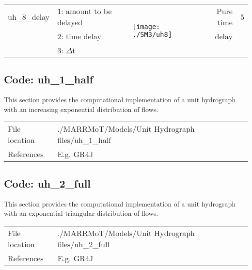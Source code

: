 \begin{table}[ht!]
\begin{tabular}{rp{10.57em}lrl}
\multicolumn{1}{p{6.215em}}{uh\_8\_delay} & 1: amount to be delayed & \multirow{3}[1]{*}{ \begin{minipage}{3cm} \texttt{[image: ./SM3/uh8]} \end{minipage} } & \multicolumn{1}{p{8.43em}}{Pure time} & 5 \\
          & 2: time delay &       & \multicolumn{1}{p{8.43em}}{delay} &  \\
          & 3: $\Delta$t  &       &       &  \\

    \bottomrule
    \end{tabular}%
  \label{tab:sm3_1}%
\end{table}%

\newpage
\subsection{Code: uh\_1\_half} \label{sec:sm3_1}
This section provides the computational implementation of a unit hydrograph with an increasing exponential distribution of flows. \\

\begin{tabular}{ll}
	File location & 	./MARRMoT/Models/Unit Hydrograph files/uh\_1\_half \\
	References & 	E.g. GR4J \citep{Perrin2003} \\
\end{tabular}

\bigskip


\subsection{Code: uh\_2\_full} \label{sec:sm3_2}
This section provides the computational implementation of a unit hydrograph with an exponential triangular distribution of flows. \\

\begin{tabular}{ll}
	File location & 	./MARRMoT/Models/Unit Hydrograph files/uh\_2\_full \\
	References & 	E.g. GR4J \citep{Perrin2003} \\
\end{tabular}

\bigskip


